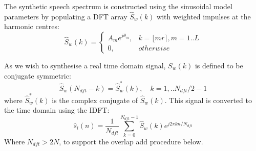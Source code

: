 \documentclass{article}
\begin{document}
{\begin{figure}[h]
\begin{center}
\begin{tikzpicture}[auto, node distance=2cm,>=triangle 45,x=1.0cm,y=1.0cm, align=center]
\end{tikzpicture}
\end{center}
\end{figure}

The synthetic speech spectrum is constructed using the sinusoidal model parameters by populating a DFT array $\hat{S}_w(k)$ with weighted impulses at the harmonic centres:
\begin{equation}
\hat{S}_w(k) = \begin{cases}
                A_m e^{j\theta_m}, & k = \lfloor m r \rceil, m=1..L \\
                0, & otherwise
                \end{cases}
\end{equation}

As we wish to synthesise a real time domain signal, $S_w(k)$ is defined to be conjugate symmetric:
\begin{equation}
\hat{S}_w(N_{dft}-k) = \hat{S}_w^{*}(k), \quad k = 1,.. N_{dft}/2-1
\end{equation}
where $\hat{S}_w^*(k)$ is the complex conjugate of $\hat{S}_w(k)$. This signal is converted to the time domain
using the IDFT:
\begin{equation}
\label{eq:synth_idft}
\hat{s}_l(n) = \frac{1}{N_{dft}}\sum_{k=0}^{N_{dft}-1} \hat{S}_w(k) e^{j 2 \pi k n / N_{dft}}
\end{equation}
Where $N_{dft} > 2N$, to support the overlap add procedure below.

}
\end{document}
